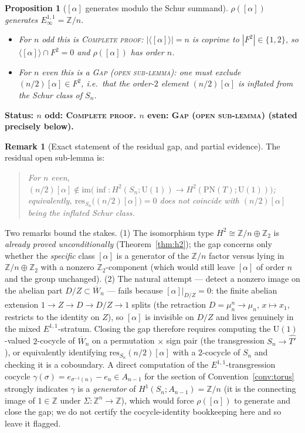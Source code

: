 \documentclass[11pt]{article}
\newtheorem{proposition}[theorem]{Proposition}
\theoremstyle{definition}
\newtheorem{remark}[theorem]{Remark}
\newcommand{\U}{\mathrm{U}}
\newcommand{\PN}{\mathrm{PN}}
\newcommand{\Z}{\mathbb{Z}}
\newcommand{\im}{\mathrm{im}}
\newcommand{\res}{\mathrm{res}}
\newcommand{\Wn}{\overline{W}_{n}}
\newcommand{\Thatp}{\widehat{T'}}
\newcommand{\STAT}[1]{\noindent\textbf{Status: #1}}
\newcommand{\COMPLETE}{\textsc{Complete proof}}
\newcommand{\GAP}{\textsc{Gap (open sub-lemma)}}
\begin{document}
\begin{proposition}[{$[\alpha]$} generates modulo the Schur summand]\label{prop:gen}
$\rho([\alpha])$ generates $E_\infty^{1,1}=\Z/n$.
\begin{itemize}
\item[$\bullet$] For $n$ odd this is \COMPLETE: $|\langle[\alpha]\rangle|=n$ is coprime to
$|F^2|\in\{1,2\}$, so $\langle[\alpha]\rangle\cap F^2=0$ and $\rho([\alpha])$ has order $n$.
\item[$\bullet$] For $n$ even this is a \GAP: one must exclude $(n/2)[\alpha]\in F^2$, i.e.\
that the order-$2$ element $(n/2)[\alpha]$ is inflated from the Schur class of $S_n$.
\end{itemize}
\end{proposition}
\STAT{$n$ odd: \COMPLETE. $n$ even: \GAP{} (stated precisely below).}

\begin{remark}[Exact statement of the residual gap, and partial evidence]\label{rem:gap}
The residual open sub-lemma is:
\begin{quote}\itshape
For $n$ even, $(n/2)[\alpha]\notin\im\big(\inf\colon H^2(S_n;\U(1))\to
H^2(\PN(T);\U(1))\big)$; equivalently, $\res_{S_n}\big((n/2)[\alpha]\big)=0$ does \emph{not}
coincide with $(n/2)[\alpha]$ being the inflated Schur class.
\end{quote}
Two remarks bound the stakes. (1) The isomorphism type $H^2\cong\Z/n\oplus\Z_2$ is
\emph{already proved unconditionally} (Theorem~\ref{thm:h2}); the gap concerns only whether
the \emph{specific} class $[\alpha]$ is a generator of the $\Z/n$ factor versus lying in
$\Z/n\oplus\Z_2$ with a nonzero $\Z_2$-component (which would still leave $[\alpha]$ of order
$n$ and the group unchanged). (2) The natural attempt --- detect a nonzero image on the
abelian part $D/Z\subset\Wn$ --- fails because $[\alpha]|_{D/Z}=0$: the finite abelian
extension $1\to Z\to D\to D/Z\to1$ splits (the retraction $D=\mu_n^n\to\mu_n$,
$x\mapsto x_1$, restricts to the identity on $Z$), so $[\alpha]$ is invisible on $D/Z$ and
lives genuinely in the mixed $E^{1,1}$-stratum. Closing the gap therefore requires computing
the $\U(1)$-valued $2$-cocycle of $\Wn$ on a permutation$\,\times\,$sign pair (the
transgression $S_n\to\Thatp$), or equivalently identifying $\res_{S_n}(n/2)[\alpha]$ with a
$2$-cocycle of $S_n$ and checking it is a coboundary. A direct computation of the
$E^{1,1}$-transgression cocycle $\gamma(\sigma)=e_{\sigma^{-1}(n)}-e_n\in A_{n-1}$ for the
section of Convention~\ref{conv:torus} strongly indicates $\gamma$ is a \emph{generator} of
$H^1(S_n;A_{n-1})=\Z/n$ (it is the connecting image of $1\in\Z$ under
$\Sigma\colon\Z^n\to\Z$), which would force $\rho([\alpha])$ to generate and close the gap;
we do not certify the cocycle-identity bookkeeping here and so leave it flagged.
\end{remark}
\end{document}
